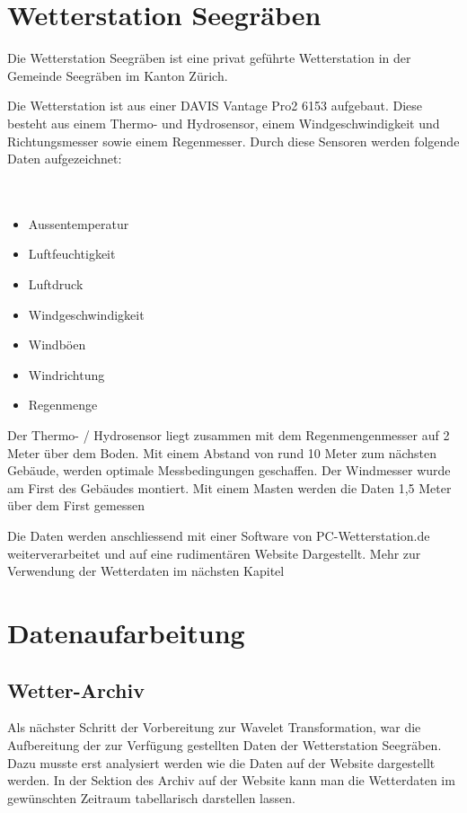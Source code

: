 \begin{refsection}
\section{Wetterstation Seegräben}

Die Wetterstation Seegräben ist eine privat geführte Wetterstation in der Gemeinde Seegräben im Kanton Zürich.

Die Wetterstation ist aus einer DAVIS Vantage Pro2 6153 aufgebaut.
Diese besteht aus einem Thermo- und  Hydrosensor, einem Windgeschwindigkeit und Richtungsmesser sowie einem Regenmesser. 
Durch diese Sensoren werden folgende Daten aufgezeichnet:
\\
\\
\\

\begin{itemize}
	\item Aussentemperatur
	\item Luftfeuchtigkeit
	\item Luftdruck
	\item Windgeschwindigkeit
	\item Windböen
	\item Windrichtung
	\item Regenmenge
\end{itemize}

Der Thermo- / Hydrosensor liegt zusammen mit dem Regenmengenmesser auf 2 Meter über dem Boden. Mit einem Abstand von rund 10 Meter zum nächsten Gebäude, werden optimale Messbedingungen geschaffen. Der Windmesser wurde am First des Gebäudes montiert. Mit einem Masten werden die Daten 1,5 Meter über dem First gemessen 

Die Daten werden anschliessend mit einer Software von PC-Wetterstation.de weiterverarbeitet und auf eine rudiment\"aren Website Dargestellt. Mehr zur Verwendung der Wetterdaten im n\"achsten Kapitel




\section{Datenaufarbeitung}
\subsection{Wetter-Archiv}
Als n\"achster Schritt der Vorbereitung zur Wavelet Transformation, war die Aufbereitung der zur Verf\"ugung gestellten Daten der Wetterstation Seegr\"aben.
Dazu musste erst analysiert werden wie die Daten auf der Website dargestellt werden.
In der Sektion des Archiv auf der Website kann man die Wetterdaten im gew\"unschten Zeitraum tabellarisch darstellen lassen.

\end{refsection}
